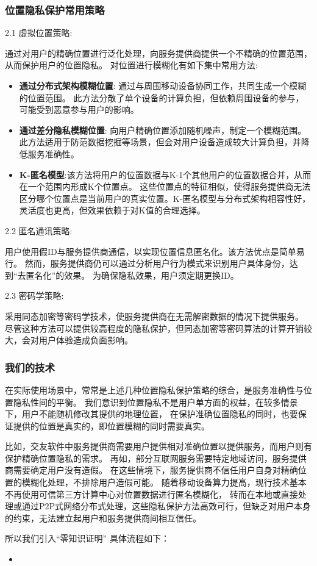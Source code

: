 \documentclass[zihao=-4]{ctexart}
\begin{document}
\subsubsection{位置隐私保护常用策略}
2.1 虚拟位置策略: \par
通过对用户的精确位置进行泛化处理，向服务提供商提供一个不精确的位置范围，从而保护用户的位置隐私。
对位置进行模糊化有如下集中常用方法:
\begin{itemize}
  \item \textbf{通过分布式架构模糊位置}: 通过与周围移动设备协同工作，共同生成一个模糊的位置范围。
  此方法分散了单个设备的计算负担，但依赖周围设备的参与，可能受到恶意参与用户的影响。
  \item \textbf{通过差分隐私模糊位置}: 向用户精确位置添加随机噪声，制定一个模糊范围。此方法适用于防范数据挖掘等场景，但会对用户设备造成较大计算负担，并降低服务准确性。
  \item \textbf{K-匿名模型}:该方法将用户的位置数据与K-1个其他用户的位置数据合并，从而在一个范围内形成K个位置点。
  这些位置点的特征相似，使得服务提供商无法区分哪个位置点是当前用户的真实位置。K-匿名模型与分布式架构相容性好，灵活度也更高，但效果依赖于对K值的合理选择。
\end{itemize}
\par
2.2 匿名通讯策略: \par
用户使用假ID与服务提供商通信，以实现位置信息匿名化。该方法优点是简单易行。
然而，服务提供商仍可以通过分析用户行为模式来识别用户具体身份，达到“去匿名化”的效果。
为确保隐私效果，用户须定期更换ID。
\par
2.3 密码学策略: \par
采用同态加密等密码学技术，使服务提供商在无需解密数据的情况下提供服务。
尽管这种方法可以提供较高程度的隐私保护，但同态加密等密码算法的计算开销较大，会对用户体验造成负面影响。

\subsubsection{我们的技术}
在实际使用场景中，常常是上述几种位置隐私保护策略的综合，是服务准确性与位置隐私性间的平衡。
我们意识到位置隐私不是用户单方面的权益，在较多情景下，用户不能随机修改其提供的地理位置，
在保护准确位置隐私的同时，也要保证提供的位置是真实的，即位置模糊的同时需要真实。
\par
比如，交友软件中服务提供商需要用户提供相对准确位置以提供服务，而用户则有保护精确位置隐私的需求。
再如，部分互联网服务需要特定地域访问，服务提供商需要确定用户没有造假。
在这些情境下，服务提供商不信任用户自身对精确位置的模糊化处理，不排除用户造假可能。
随着移动设备算力提高，现行技术基本不再使用可信第三方计算中心对位置数据进行匿名模糊化，
转而在本地或直接处理或通过P2P式网络分布式处理，这些隐私保护方法高效可行，但缺乏对用户本身的约束，无法建立起用户和服务提供商间相互信任。
\par
所以我们引入“零知识证明”
具体流程如下：
\begin{itemize}
  \item 
\end{itemize}
\end{document}
